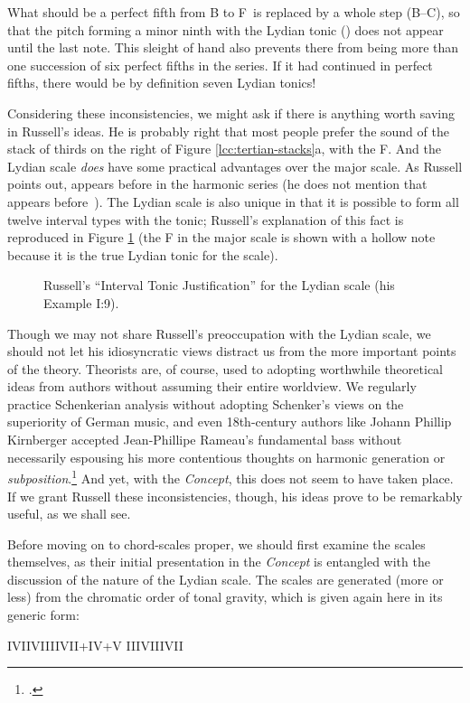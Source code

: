 \noindent What should be a perfect fifth from B to F\sharp\ is replaced by a
whole step (B--C\sharp), so that the pitch forming a minor ninth with the
Lydian tonic (\Gflat) does not appear until the last note. This sleight of
hand also prevents there from being more than one succession of six perfect
fifths in the series. If it had continued in perfect fifths, there would be by
definition seven Lydian tonics!

Considering these inconsistencies, we might ask if there is anything worth
saving in Russell's ideas. He is probably right that most people prefer the
sound of the stack of thirds on the right of Figure \ref{lcc:tertian-stacks}a,
with the F\sharp. And the Lydian scale \emph{does} have some
practical advantages over the major scale. As Russell points out, \sharp{}
appears before \nat{} in the harmonic series (he does not mention that
\flat{} appears before \nat{}\,). The Lydian scale is also unique in that
it is possible to form all twelve interval types with the tonic; Russell's
explanation of this fact is reproduced in Figure \ref{lcc:lydian-intervals}
(the F in the major scale is shown with a hollow note because it is the true
Lydian tonic for the scale).

\begin{figure}[tbp]
  \caption[Russell's ``Interval Tonic Justification'' for the Lydian
  scale.]{Russell's ``Interval Tonic Justification'' for the Lydian scale
    (his Example I:9).}
  \label{lcc:lydian-intervals}
\end{figure}

Though we may not share Russell's preoccupation with the Lydian scale, we
should not let his idiosyncratic views distract us from the more important
points of the theory. Theorists are, of course, used to adopting worthwhile
theoretical ideas from authors without assuming their entire worldview. We
regularly practice Schenkerian analysis without adopting Schenker's views on
the superiority of German music, and even 18th-century authors like Johann
Phillip Kirnberger accepted Jean-Phillipe Rameau's fundamental bass without
necessarily espousing his more contentious thoughts on harmonic generation or
\emph{subposition}.\footcite[240--41]{lester:1992} And yet, with the
\emph{Concept}, this does not seem to have taken place. If we grant
Russell these inconsistencies, though, his ideas prove to be remarkably
useful, as we shall see.

Before moving on to chord-scales proper, we should first examine the scales
themselves, as their initial presentation in the \emph{Concept} is entangled
with the discussion of the nature of the Lydian scale. The scales are
generated (more or less) from the chromatic order of tonal gravity, which is
given again here in its generic form: \\
{\centering I\quad V\quad II\quad VI\quad III\quad VII\quad +IV\quad +V\quad
  \flat{}III\quad \flat{}VII\quad IV\quad \flat{}II\quad \par}

